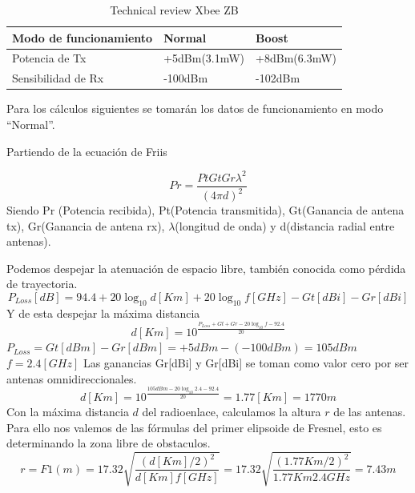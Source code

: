 \documentclass[11pt,oneside,spanish,a4paper]{article}
\begin{document}
\begin{table}[h]
\centering
\begin{tabular}{l l l}
\hline
\textbf{Modo de funcionamiento} & \textbf{Normal} & \textbf{Boost}\\
\hline
Potencia de Tx & +5dBm(3.1mW) & +8dBm(6.3mW) \\
Sensibilidad de Rx & -100dBm & -102dBm\\
\hline
\end{tabular}
\caption{Technical review Xbee ZB}
\end{table}
Para los c\'alculos siguientes se tomar\'an los datos de funcionamiento en modo ``Normal''.

Partiendo de la ecuaci\'on de Friis




\begin{equation*}
\label{Ec:Friis}
Pr = \frac{Pt Gt Gr \lambda ^{2}}{(4\pi d)^2}
\end{equation*}
Siendo Pr (Potencia recibida), Pt(Potencia transmitida), Gt(Ganancia de antena tx), Gr(Ganancia de antena rx), $\lambda$(longitud de onda) y d(distancia radial entre antenas).

Podemos despejar la atenuaci\'on de espacio libre, tambi\'en conocida como p\'erdida de trayectoria.
\begin{equation*}
\label{Ec:perdida}
P_{Loss}[dB] = 94.4 + 20 \log_{10}d [Km] + 20 \log_{10}f [GHz] - Gt[dBi] - Gr[dBi]
\end{equation*}
	Y de esta despejar la m\'axima distancia
\begin{equation*}
\label{Ec:distancia}
d[Km] = 10^{\frac{P_{Loss} + Gt + Gr - 20 \log_{10}f - 92.4}{20}}
\end{equation*}
$P_{Loss}=Gt[dBm] - Gr[dBm] = +5dBm - (-100dBm) = 105dBm$
$f = 2.4 [GHz]$
Las ganancias Gr[dBi] y Gr[dBi] se toman como valor cero por ser antenas omnidireccionales.
\begin{equation*}
\label{Ec:distancia1}
d[Km] = 10^{\frac{105 dBm - 20 \log_{10}2.4 - 92.4}{20}} = 1.77 [Km] =1770m
\end{equation*}	
Con la m\'axima distancia $d$ del radioenlace, calculamos la altura $r$ de las antenas. Para ello nos valemos de las f\'ormulas del primer elipsoide de Fresnel, esto es determinando la zona libre de obstaculos.
\begin{equation*}
\label{Ec:fresnel}
r = F1(m) = 17.32 \sqrt{\frac{(d[Km]/2)^2}{d[Km]f[GHz]}} = 17.32 \sqrt{\frac{(1.77Km/2)^2}{1.77Km2.4GHz}} = 7.43m
\end{equation*}	
\end{document}
